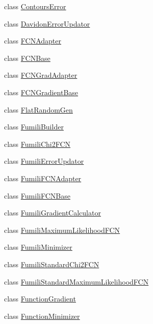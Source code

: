 \begin{DoxyCompactItemize}
\item 
class \mbox{\hyperlink{classROOT_1_1Minuit2_1_1ContoursError}{Contours\+Error}}
\item 
class \mbox{\hyperlink{classROOT_1_1Minuit2_1_1DavidonErrorUpdator}{Davidon\+Error\+Updator}}
\item 
class \mbox{\hyperlink{classROOT_1_1Minuit2_1_1FCNAdapter}{F\+C\+N\+Adapter}}
\item 
class \mbox{\hyperlink{classROOT_1_1Minuit2_1_1FCNBase}{F\+C\+N\+Base}}
\item 
class \mbox{\hyperlink{classROOT_1_1Minuit2_1_1FCNGradAdapter}{F\+C\+N\+Grad\+Adapter}}
\item 
class \mbox{\hyperlink{classROOT_1_1Minuit2_1_1FCNGradientBase}{F\+C\+N\+Gradient\+Base}}
\item 
class \mbox{\hyperlink{classROOT_1_1Minuit2_1_1FlatRandomGen}{Flat\+Random\+Gen}}
\item 
class \mbox{\hyperlink{classROOT_1_1Minuit2_1_1FumiliBuilder}{Fumili\+Builder}}
\item 
class \mbox{\hyperlink{classROOT_1_1Minuit2_1_1FumiliChi2FCN}{Fumili\+Chi2\+F\+CN}}
\item 
class \mbox{\hyperlink{classROOT_1_1Minuit2_1_1FumiliErrorUpdator}{Fumili\+Error\+Updator}}
\item 
class \mbox{\hyperlink{classROOT_1_1Minuit2_1_1FumiliFCNAdapter}{Fumili\+F\+C\+N\+Adapter}}
\item 
class \mbox{\hyperlink{classROOT_1_1Minuit2_1_1FumiliFCNBase}{Fumili\+F\+C\+N\+Base}}
\item 
class \mbox{\hyperlink{classROOT_1_1Minuit2_1_1FumiliGradientCalculator}{Fumili\+Gradient\+Calculator}}
\item 
class \mbox{\hyperlink{classROOT_1_1Minuit2_1_1FumiliMaximumLikelihoodFCN}{Fumili\+Maximum\+Likelihood\+F\+CN}}
\item 
class \mbox{\hyperlink{classROOT_1_1Minuit2_1_1FumiliMinimizer}{Fumili\+Minimizer}}
\item 
class \mbox{\hyperlink{classROOT_1_1Minuit2_1_1FumiliStandardChi2FCN}{Fumili\+Standard\+Chi2\+F\+CN}}
\item 
class \mbox{\hyperlink{classROOT_1_1Minuit2_1_1FumiliStandardMaximumLikelihoodFCN}{Fumili\+Standard\+Maximum\+Likelihood\+F\+CN}}
\item 
class \mbox{\hyperlink{classROOT_1_1Minuit2_1_1FunctionGradient}{Function\+Gradient}}
\item 
class \mbox{\hyperlink{classROOT_1_1Minuit2_1_1FunctionMinimizer}{Function\+Minimizer}}

\end{DoxyCompactItemize}
